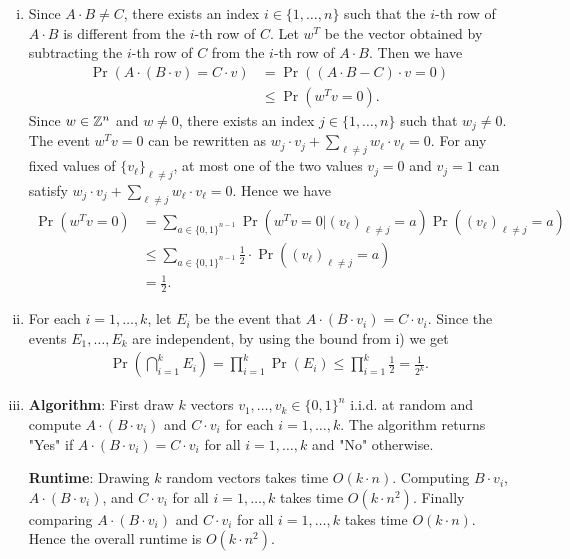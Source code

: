 \documentclass[11pt]{article}
\renewcommand{\leq}{\leqslant}
\begin{document}
\begin{enumerate}[1)]
\begin{solution}
\begin{enumerate}[i)]
	\item Since $A \cdot B \neq C$, there exists an index $i \in \{1, \ldots, n\}$ such that the $i$-th row of $A \cdot B$ is different from the $i$-th row of $C$. Let $w^T$ be the vector obtained by subtracting the $i$-th row of $C$ from the $i$-th row of $A \cdot B$. Then we have
	\begin{align*}
		\Pr(A \cdot (B \cdot v) = C \cdot v) &= \Pr((A \cdot B - C) \cdot v = 0) \\
		&\leq \Pr(w^T v = 0).
	\end{align*}
	Since $w \in \mathbb{Z}^n$ and $w \neq 0$, there exists an index $j \in \{1, \ldots, n\}$ such that $w_j \neq 0$. The event $w^T v = 0$ can be rewritten as $w_j \cdot v_j + \sum_{\ell \neq j} w_\ell \cdot v_\ell = 0$. For any fixed values of $\{v_\ell\}_{\ell \neq j}$, at most one of the two values $v_j = 0$ and $v_j = 1$ can satisfy $w_j \cdot v_j + \sum_{\ell \neq j} w_\ell \cdot v_\ell = 0$. 
	Hence we have 
	\begin{align*}
	\Pr(w^T v = 0) &= \sum_{a \in \{0,1\}^{n-1}} \Pr(w^T v = 0 | (v_\ell)_{\ell \neq j} = a) \Pr((v_\ell)_{\ell \neq j} = a) \\
	 &\leq \sum_{a \in \{0,1\}^{n-1}} \frac{1}{2}\cdot \Pr((v_\ell)_{\ell \neq j} = a) \\
	 &= \frac{1}{2}.
	\end{align*}
	\item For each $i=1, \ldots, k$, let $E_i$ be the event that $A \cdot (B \cdot v_i) = C \cdot v_i$. Since the events $E_1, \ldots, E_k$ are independent, by using the bound from i) we get
	\begin{align*}
		\Pr\left(\bigcap_{i=1}^k E_i\right) = \prod_{i=1}^k \Pr(E_i) \leq \prod_{i=1}^k \frac{1}{2} = \frac{1}{2^k}.
	\end{align*}
	\item
	\textbf{Algorithm}: First draw $k$ vectors $v_1, \ldots, v_k \in \{0, 1\}^n$ i.i.d. at random and compute $A \cdot (B \cdot v_i)$ and $C \cdot v_i$ for each $i=1, \ldots, k$. 
	The algorithm returns "Yes" if $A \cdot (B \cdot v_i) = C \cdot v_i$ for all $i=1, \ldots, k$ and "No" otherwise.
	
	\textbf{Runtime}: Drawing $k$ random vectors takes time $O(k \cdot n)$. Computing $B \cdot v_i$, $A \cdot (B \cdot v_i)$, and $C \cdot v_i$ for all $i=1, \ldots, k$ takes time $O(k \cdot n^2)$. Finally comparing $A \cdot (B \cdot v_i)$ and $C \cdot v_i$ for all $i=1, \ldots, k$ takes time $O(k \cdot n)$. Hence the overall runtime is $O(k \cdot n^2)$.


\end{enumerate}
\end{solution}
\end{enumerate}
\end{document}
